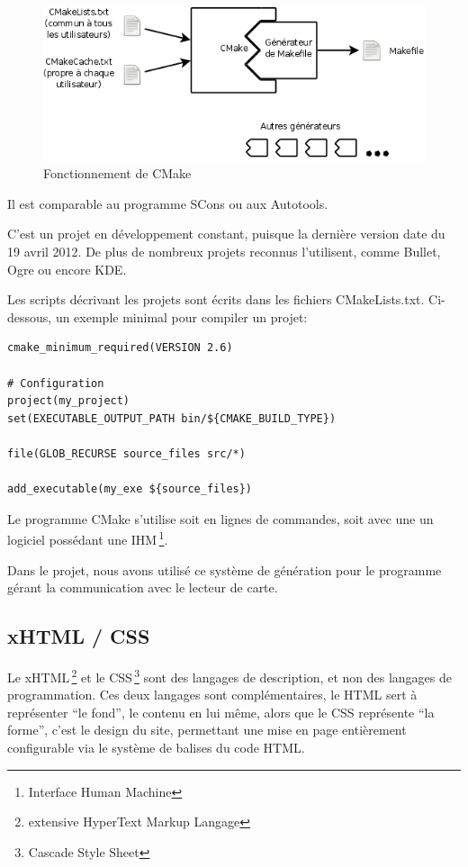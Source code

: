     \begin{figure}[h]
        \begin{center}
        \includegraphics[scale=0.4]{images/CMakeFonctionnement.png} 
        \end{center}
        \caption{Fonctionnement de CMake}
        \label{Fonctionnement de CMake}
     \end{figure} 

Il est comparable au programme SCons ou aux Autotools.

C'est un projet en développement constant, puisque la dernière version date du 19
avril 2012. De plus de nombreux projets reconnus l'utilisent, comme Bullet, Ogre
ou encore KDE.

Les scripts décrivant les projets sont écrits dans les fichiers CMakeLists.txt.
Ci-dessous, un exemple minimal pour compiler un projet:

    \lstset{language=Bash}
    \begin{lstlisting} 
cmake_minimum_required(VERSION 2.6)
		
# Configuration
project(my_project)
set(EXECUTABLE_OUTPUT_PATH bin/${CMAKE_BUILD_TYPE})

file(GLOB_RECURSE source_files src/*)

add_executable(my_exe ${source_files})
    \end{lstlisting}

Le programme CMake s'utilise soit en lignes de commandes, soit avec une un logiciel
possédant une IHM\,\footnote{Interface Human Machine}.

Dans le projet, nous avons utilisé ce système de génération pour le programme 
gérant la communication avec le lecteur de carte.


        \subsection{xHTML / CSS}
Le xHTML\,\footnote{extensive HyperText Markup Langage} et le CSS\,\footnote{Cascade Style Sheet} sont
des langages de description, et non des langages de programmation.
Ces deux langages sont complémentaires, le HTML sert à représenter ``le fond'', le contenu
en lui même, alors que le CSS représente ``la forme'', c'est le design du site, permettant
une mise en page entièrement configurable via le système de balises du code HTML.

